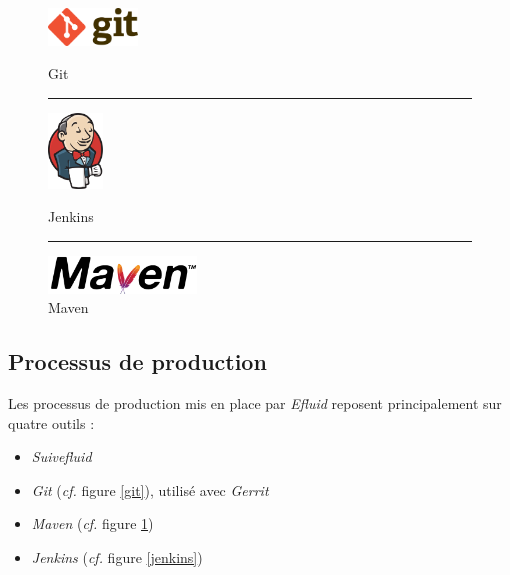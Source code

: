 \documentclass[a4paper, 12pt]{report}
\begin{document}
\begin{figure}[b]
  \begin{center}
    \begin{minipage}{4cm}
      \begin{center}
        \vspace{0.5cm}
        \includegraphics[height=1cm]{../res/git.png}
        \null
        \vspace{0.5cm}
        \caption{Git}
        \label{git}
      \end{center}
    \end{minipage}
    \rule{1cm}{0cm}
    \begin{minipage}{4cm}
      \begin{center}
        \includegraphics[height=2cm]{../res/jenkins.png}
        \caption{Jenkins}
        \label{jenkins}
      \end{center}
    \end{minipage}
    \rule{1cm}{0cm}
    \begin{minipage}{4cm}
      \begin{center}
        \vspace{0.5cm}
        \includegraphics[height=1cm]{../res/maven.png}
        \null
        \caption{Maven}
        \label{maven}
      \end{center}
    \end{minipage}
  \end{center}
\end{figure}

\subsection{Processus de production}

Les processus de production mis en place par \textit{Efluid} reposent principalement sur quatre outils :\\

\begin{itemize}
  \item \textit{Suivefluid}
  \item \textit{Git} (\textit{cf.} figure \ref{git}), utilisé avec \textit{Gerrit}
  \item \textit{Maven} (\textit{cf.} figure \ref{maven})
  \item \textit{Jenkins} (\textit{cf.} figure \ref{jenkins})
\end{itemize}
\vspace{0.5cm}
\end{document}
